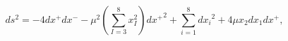 \begin{equation} \label{eq:dBmetric}
ds^2 = - 4 dx^+ dx^- -\mu^2 \left(\sum_{I=3}^8 x_I^2 \right) {dx^+}^2 +
 \sum_{i=1}^8 {dx_i}^2 + 4 \mu x_2 dx_1 dx^+ ,
\end{equation}

